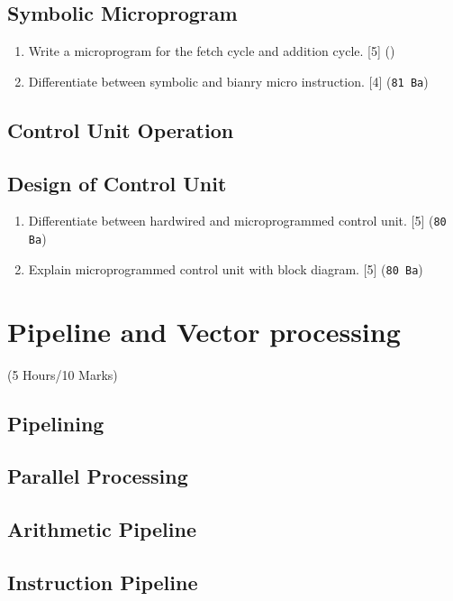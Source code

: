 \documentclass[12pt]{article}
\begin{document}
	\subsection{Symbolic Microprogram}
		\begin{enumerate}[noitemsep, topsep=0pt]
			\item Write a microprogram for the fetch cycle and addition cycle. \hfill [5] ()
			
			\item Differentiate between symbolic and bianry micro instruction. \hfill [4] (\texttt{81 Ba})
		\end{enumerate}
		
	\subsection{Control Unit Operation}
	
	\subsection{Design of Control Unit}
		\begin{enumerate}[noitemsep, topsep=0pt]
			\item Differentiate between hardwired and microprogrammed control unit. \hfill [5] (\texttt{80 Ba})
			
			\item Explain microprogrammed control unit with block diagram. \hfill [5] (\texttt{80 Ba})
		\end{enumerate}

	\pagebreak
\section{Pipeline and Vector processing}
	\begin{center}(5 Hours/10 Marks)\end{center}
	\subsection{Pipelining}
	\subsection{Parallel Processing}
	\subsection{Arithmetic Pipeline}
	\subsection{Instruction Pipeline}
\end{document}
